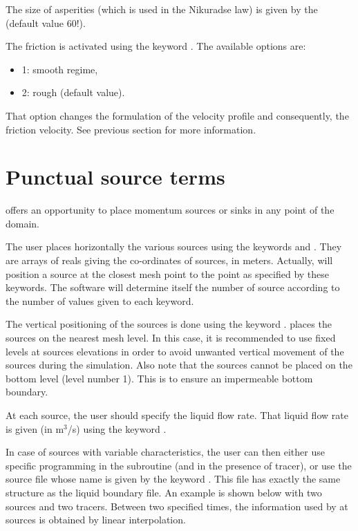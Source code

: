 The size of asperities (which is used in the Nikuradse law) is given by the
 (default value 60!).

The friction is activated using the keyword . The available options are:

\begin{itemize}
\item  1: smooth regime,

\item  2: rough (default value).
\end{itemize}

That option changes the formulation of the velocity profile and consequently,
the friction velocity. See previous section for more information.

\section{Punctual source terms}
\label{sec:srcfile}
 offers an opportunity to place momentum sources or sinks in any
point of the domain.

The user places horizontally the various sources using the keywords
 and . They are
arrays of reals giving the co-ordinates of sources, in meters. Actually,
 will position a source at the closest mesh point to the point as
specified by these keywords. The software will determine itself the number of
source according to the number of values given to each keyword.

The vertical positioning of the sources is done using the keyword
.  places the sources on the nearest
mesh level. In this case, it is recommended to use fixed levels at sources
elevations in order to avoid unwanted vertical movement of the sources during
the simulation. Also note that the sources cannot be placed on the bottom level
(level number 1). This is to ensure an impermeable bottom boundary.

At each source, the user should specify the liquid flow rate. That liquid flow
rate is given (in m${}^{3}$/s) using the keyword .

In case of sources with variable characteristics, the user can then either use
specific programming in the  subroutine (and
 in the presence of tracer), or use the source file whose
name is given by the keyword .
This file has exactly the same structure as the liquid
boundary file. An example is shown below with two sources and two tracers.
Between two specified times, the information used by  at sources is
obtained by linear interpolation.

